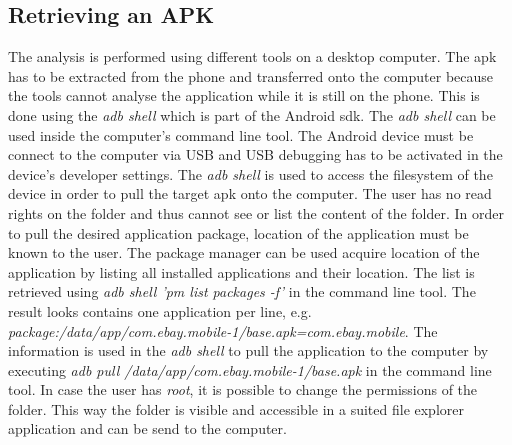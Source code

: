 \subsection{Retrieving an APK} \label{subsection:tools-apk}
The analysis is performed using different tools on a desktop computer.
The \gls{apk} has to be extracted from the phone and transferred onto the computer because the tools cannot analyse the application while it is still on the phone.
This is done using the \textit{adb shell} which is part of the Android \gls{sdk}.
\newline
The \textit{adb shell} can be used inside the computer’s command line tool.
The Android device must be connect to the computer via USB and USB debugging has to be activated in the device’s developer settings.
The \textit{adb shell} is used to access the filesystem of the device in order to pull the target \gls{apk} onto the computer.
The user has no read rights on the folder and thus cannot see or list the content of the folder.
In order to pull the desired application package, location of the application must be known to the user.
The package manager can be used acquire location of the application by listing all installed applications and their location.
The list is retrieved using \textit{adb shell 'pm list packages -f'} in the command line tool.
The result looks contains one application per line, e.g. \textit{package:/data/app/com.ebay.mobile-1/base.apk=com.ebay.mobile}.
The information is used in the \textit{adb shell} to pull the application to the computer by executing \textit{adb pull /data/app/com.ebay.mobile-1/base.apk} in the command line tool.
\newline
In case the user has \textit{root}, it is possible to change the permissions of the folder.
This way the folder is visible and accessible in a suited file explorer application and can be send to the computer.
